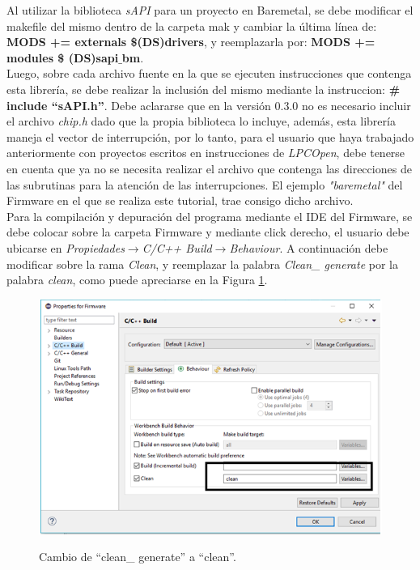 \documentclass[12pt,letterpaper]{article}
\begin{document}
Al utilizar la biblioteca \textit{sAPI} para un proyecto en Baremetal, se debe modificar el makefile del mismo dentro de la carpeta mak y cambiar la última línea de: \textbf{MODS += externals \$(DS)drivers}, y reemplazarla por:  \textbf{MODS += modules \$ (DS)sapi$\_$bm}.
 \\
 
Luego, sobre cada archivo fuente en la que se ejecuten instrucciones que contenga esta librería, se debe realizar la inclusión del mismo mediante la instruccion: \textbf{\# include “sAPI.h”}. Debe aclararse que en la versión 0.3.0 no es necesario incluir el archivo \textit{chip.h} dado que la propia biblioteca lo incluye, además, esta librería maneja el vector de interrupción, por lo tanto, para el usuario que haya trabajado anteriormente con proyectos escritos en instrucciones de \textit{LPCOpen}, debe tenerse en cuenta que ya no se necesita realizar el archivo que contenga las direcciones de las subrutinas para la atención de las interrupciones. El ejemplo \textit{"baremetal"} del Firmware en el que se realiza este tutorial, trae consigo dicho archivo.
 \\
 
Para la compilación y depuración del programa mediante el IDE del Firmware, se debe colocar sobre la carpeta Firmware y mediante click derecho, el usuario debe ubicarse en \textit{Propiedades}$\rightarrow$\textit{C/C++ Build}$\rightarrow$\textit{Behaviour}. A continuación debe modificar sobre la rama \textit{Clean}, y reemplazar la palabra \textit{Clean\_ generate} por la palabra \textit{clean}, como puede apreciarse en la Figura \ref{Fig19}.
\begin{figure}[H]
\centering
\includegraphics[width=8 cm]{figuras/f1.png}\\
\caption{Cambio de “clean\_ generate” a “clean”.}
\label{Fig19}
\end{figure}
\end{document}
